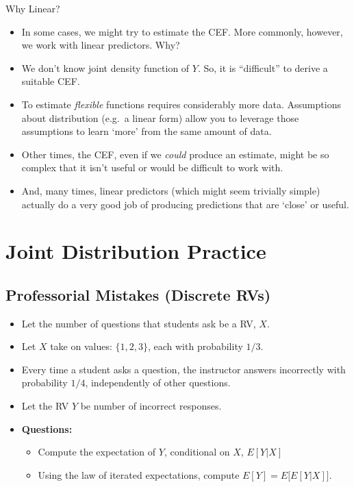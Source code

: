 \documentclass[
]{book}
\providecommand{\tightlist}{%
  \setlength{\itemsep}{0pt}\setlength{\parskip}{0pt}}
\theoremstyle{definition}
\theoremstyle{definition}
\theoremstyle{definition}
\theoremstyle{definition}
\theoremstyle{remark}
\begin{document}
Why Linear?

\begin{itemize}
\item
  In some cases, we might try to estimate the CEF. More commonly, however, we work with linear predictors. Why?
\item
  We don't know joint density function of \(Y\). So, it is ``difficult'' to derive a suitable CEF.
\item
  To estimate \emph{flexible} functions requires considerably more data. Assumptions about distribution (e.g.~a linear form) allow you to leverage those assumptions to learn `more' from the same amount of data.
\item
  Other times, the CEF, even if we \emph{could} produce an estimate, might be so complex that it isn't useful or would be difficult to work with.
\item
  And, many times, linear predictors (which might seem trivially simple) actually do a very good job of producing predictions that are `close' or useful.
\end{itemize}

\section{Joint Distribution Practice}\label{joint-distribution-practice}

\subsection{Professorial Mistakes (Discrete RVs)}\label{professorial-mistakes-discrete-rvs}

\begin{itemize}
\item
  Let the number of questions that students ask be a RV, \(X\).\\
\item
  Let \(X\) take on values: \(\{1, 2, 3\}\), each with probability \(1/3\).\\
\item
  Every time a student asks a question, the instructor answers incorrectly with probability \(1/4\), independently of other questions.
\item
  Let the RV \(Y\) be number of incorrect responses.
\item
  \textbf{Questions:}

  \begin{itemize}
  \tightlist
  \item
    Compute the expectation of \(Y\), conditional on \(X\), \(E[Y|X]\)
  \item
    Using the law of iterated expectations, compute \(E[Y] = E\big[E[Y|X]\big]\).
  \end{itemize}
\end{itemize}
\end{document}
